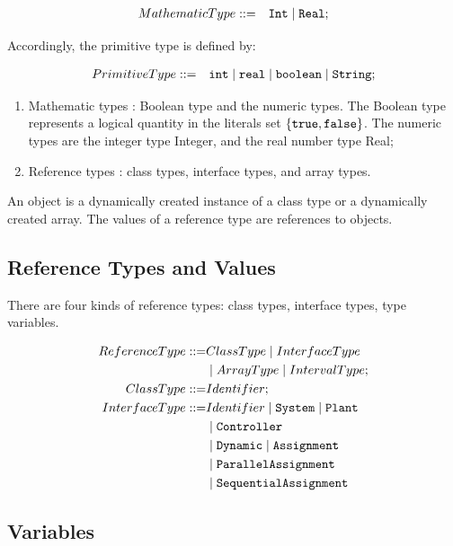 \documentclass{WileySix}
\begin{document}
\begin{eqnarray*}
 MathematicType  &::=&   {\tt Int} \mid {\tt Real};\\
\end{eqnarray*}


Accordingly, the primitive type is defined by:


\begin{eqnarray*}
 PrimitiveType &::=&  {\tt int} \mid {\tt real} \mid {\tt boolean} \mid {\tt String};\\
\end{eqnarray*}


\begin{enumerate}
\item Mathematic types : Boolean type and the numeric types. The Boolean
type represents a logical quantity in the literals set $\{ {\tt true}, {\tt false}\}$.
The numeric types are the integer type Integer, and the real number type
Real;
\item  Reference types : class types, interface types, and array types.
\end{enumerate}




An object is a dynamically created instance of a class type or a dynamically 
created array. The values of a reference type are references to objects.

\subsection{Reference Types and Values}

There are four kinds of reference types: class types, interface types, type variables.

\begin{align*}
 ReferenceType  ::=&  ClassType  \mid  InterfaceType   \\
                   &  \mid  ArrayType \mid IntervalType ;\\
 ClassType  ::=&  Identifier ;\\
 InterfaceType  ::=&  Identifier  \mid {\tt System} \mid {\tt Plant} \\
& \mid  {\tt Controller}\\
& \mid {\tt Dynamic} \mid {\tt Assignment} \\
& \mid {\tt ParallelAssignment} \\
& \mid {\tt SequentialAssignment} 
\end{align*}


\subsection{Variables}
\end{document}
